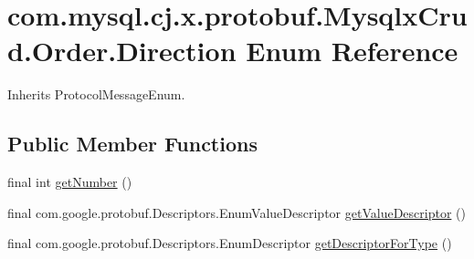 \hypertarget{enumcom_1_1mysql_1_1cj_1_1x_1_1protobuf_1_1_mysqlx_crud_1_1_order_1_1_direction}{}\section{com.\+mysql.\+cj.\+x.\+protobuf.\+Mysqlx\+Crud.\+Order.\+Direction Enum Reference}
\label{enumcom_1_1mysql_1_1cj_1_1x_1_1protobuf_1_1_mysqlx_crud_1_1_order_1_1_direction}


Inherits Protocol\+Message\+Enum.

\subsection*{Public Member Functions}
\begin{DoxyCompactItemize}
\item 
final int \mbox{\hyperlink{enumcom_1_1mysql_1_1cj_1_1x_1_1protobuf_1_1_mysqlx_crud_1_1_order_1_1_direction_a6ac82ea59955f7040d23932431feb688}{get\+Number}} ()
\item 
final com.\+google.\+protobuf.\+Descriptors.\+Enum\+Value\+Descriptor \mbox{\hyperlink{enumcom_1_1mysql_1_1cj_1_1x_1_1protobuf_1_1_mysqlx_crud_1_1_order_1_1_direction_a9f6b8b1e83daff62739b70fd9452ff90}{get\+Value\+Descriptor}} ()
\item 
final com.\+google.\+protobuf.\+Descriptors.\+Enum\+Descriptor \mbox{\hyperlink{enumcom_1_1mysql_1_1cj_1_1x_1_1protobuf_1_1_mysqlx_crud_1_1_order_1_1_direction_a08fe7dec3155300327c4eea20bcfae7b}{get\+Descriptor\+For\+Type}} ()
\end{DoxyCompactItemize}
